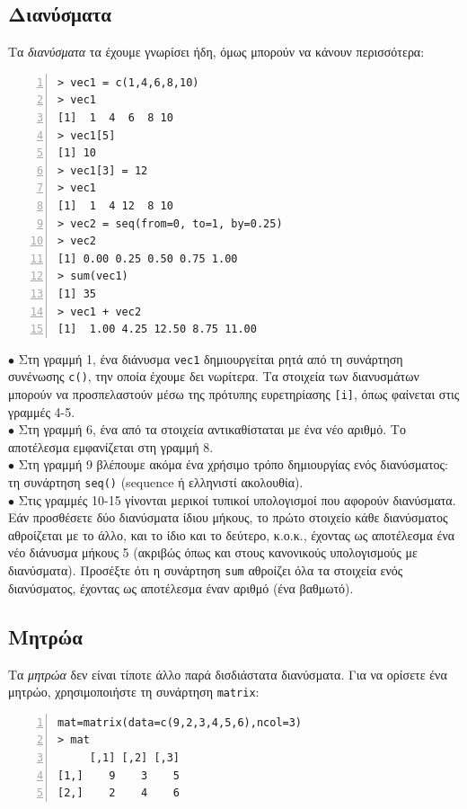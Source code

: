 \documentclass[a4paper,10pt,twocolumn]{article}
\begin{document}
\subsection{Διανύσματα}

Τα \emph{διανύσματα} τα έχουμε γνωρίσει ήδη, όμως μπορούν να κάνουν περισσότερα:

\begin{Verbatim}[frame=single,numbers=left,gobble=0, xleftmargin=0.35cm, numbersep=0.1cm]
> vec1 = c(1,4,6,8,10)
> vec1
[1]  1  4  6  8 10
> vec1[5]
[1] 10
> vec1[3] = 12
> vec1
[1]  1  4 12  8 10
> vec2 = seq(from=0, to=1, by=0.25)
> vec2
[1] 0.00 0.25 0.50 0.75 1.00
> sum(vec1)
[1] 35
> vec1 + vec2
[1]  1.00 4.25 12.50 8.75 11.00
\end{Verbatim}

\noindent $\bullet$  Στη γραμμή 1, ένα διάνυσμα \texttt{vec1} δημιουργείται ρητά από τη συνάρτηση συνένωσης
\texttt{c()}, την οποία έχουμε δει νωρίτερα. Τα στοιχεία των διανυσμάτων μπορούν να προσπελαστούν μέσω της
πρότυπης ευρετηρίασης \texttt{[i]}, όπως φαίνεται στις γραμμές 4-5. \\
\noindent $\bullet$  Στη γραμμή 6, ένα από τα στοιχεία αντικαθίσταται με ένα νέο αριθμό. Το αποτέλεσμα
εμφανίζεται στη γραμμή 8.\\
\noindent $\bullet$ Στη γραμμή 9 βλέπουμε ακόμα ένα χρήσιμο τρόπο δημιουργίας ενός διανύσματος: τη συνάρτηση
\texttt{seq()} (sequence ή ελληνιστί ακολουθία). \\
\noindent $\bullet$ Στις γραμμές 10-15 γίνονται μερικοί τυπικοί υπολογισμοί που αφορούν διανύσματα. Εάν
προσθέσετε δύο διανύσματα ίδιου μήκους, το πρώτο στοιχείο κάθε διανύσματος αθροίζεται με το άλλο, και το ίδιο
και το δεύτερο, κ.ο.κ., έχοντας ως αποτέλεσμα ένα νέο διάνυσμα μήκους 5 (ακριβώς όπως και στους κανονικούς
υπολογισμούς με διανύσματα). Προσέξτε ότι η συνάρτηση \texttt{sum} αθροίζει όλα τα στοιχεία ενός διανύσματος,
έχοντας ως αποτέλεσμα έναν αριθμό (ένα βαθμωτό).

\subsection{Μητρώα}

Τα \emph{μητρώα} δεν είναι τίποτε άλλο παρά δισδιάστατα διανύσματα. Για να ορίσετε ένα μητρώο, χρησιμοποιήστε
τη συνάρτηση \texttt{matrix}:
\begin{Verbatim}[frame=single,numbers=left,gobble=0, xleftmargin=0.35cm, numbersep=0.1cm]
mat=matrix(data=c(9,2,3,4,5,6),ncol=3)
> mat
     [,1] [,2] [,3]
[1,]    9    3    5
[2,]    2    4    6
\end{Verbatim}
\end{document}
